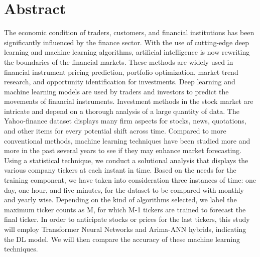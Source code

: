\chapter*{\center \Large  Abstract}

The economic condition of traders, customers, and financial institutions has been significantly 
influenced by the finance sector. With the use of cutting-edge deep learning and machine 
learning algorithms, artificial intelligence is now rewriting the boundaries of the financial 
markets. These methods are widely used in financial instrument pricing prediction, portfolio 
optimization, market trend research, and opportunity identification for investments. Deep 
learning and machine learning models are used by traders and investors to predict the movements 
of financial instruments. Investment methods in the stock market are intricate and depend on a 
thorough analysis of a large quantity of data. The Yahoo-finance dataset displays many firm 
aspects for stocks, news, quotations, and other items for every potential shift across time. 
Compared to more conventional methods, machine learning techniques have been studied more and 
more in the past several years to see if they may enhance market forecasting. 
Using a statistical technique, we conduct a solutional analysis that displays the various 
company tickers at each instant in time. Based on the needs for the training component, we have 
taken into consideration three instances of time: one day, one hour, and five minutes, for the 
dataset to be compared with monthly and yearly wise. 
Depending on the kind of algorithms selected, we label the maximum ticker counts as M, for 
which M-1 tickers are trained to forecast the final ticker. In order to anticipate stocks or 
prices for the last tickers, this study will employ Transformer Neural Networks and Arima-ANN 
hybrids, indicating the DL model. We will then compare the accuracy of these machine learning 
techniques. 


